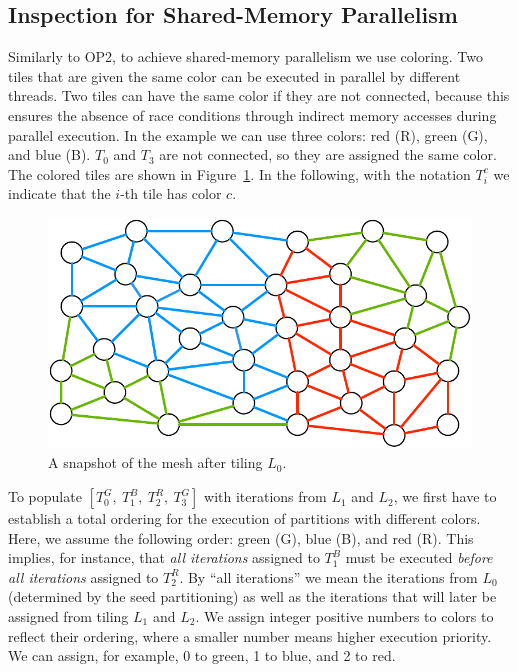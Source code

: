 \subsection*{Inspection for Shared-Memory Parallelism}
Similarly to OP2, to achieve shared-memory parallelism we use coloring. Two tiles that are given the same color can be executed in parallel by different threads. Two tiles can have the same color if they are not connected, because this ensures the absence of race conditions through indirect memory accesses during parallel execution. In the example we can use three colors: red (R), green (G), and blue (B). $T_0$ and $T_3$ are not connected, so they are assigned the same color. The colored tiles are shown in Figure~\ref{fig:st-loop-0}. In the following, with the notation $T_i^c$ we indicate that the $i$-th tile has color $c$. 

\begin{figure}
\centering
\includegraphics[scale=0.6]{sparsetiling/figures/loop_0.pdf}
\caption{A snapshot of the mesh after tiling $L_0$.}
\label{fig:st-loop-0}
\end{figure}

To populate $[T_0^G,\ T_1^B,\ T_2^R,\ T_3^G]$ with iterations from $L_1$ and $L_2$, we first have to establish a total ordering for the execution of partitions with different colors. Here, we assume the following order: green (G), blue (B), and red (R). This implies, for instance, that \textit{all iterations} assigned to $T_1^B$ must be executed \textit{before all iterations} assigned to $T_2^R$. By ``all iterations'' we mean the iterations from $L_0$ (determined by the seed partitioning) as well as the iterations that will later be assigned from tiling $L_1$ and $L_2$. We assign integer positive numbers to colors to reflect their ordering, where a smaller number means higher execution priority. We can assign, for example, 0 to green, 1 to blue, and 2 to red.

